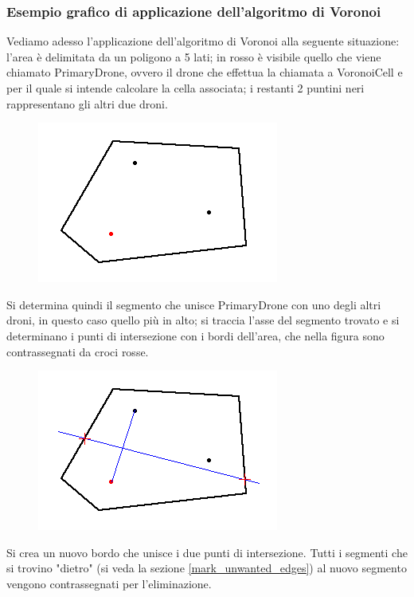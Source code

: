 \documentclass[10pt,a4paper]{article}
\newcommand{\name}[1]{{\color{purple}#1}}
\begin{document}
\subsubsection{Esempio grafico di applicazione dell'algoritmo di Voronoi}

Vediamo adesso l'applicazione dell'algoritmo di Voronoi alla seguente situazione: l'area è delimitata da un poligono a 5 lati; in rosso è visibile quello che viene chiamato \name{PrimaryDrone}, ovvero il drone che effettua la chiamata a \name{VoronoiCell} e per il quale si intende calcolare la cella associata; i restanti 2 puntini neri rappresentano gli altri due droni.

\begin{figure}[H]
\centering
\includegraphics[scale=0.7]{voronoi1.png}
\end{figure}

Si determina quindi il segmento che unisce \name{PrimaryDrone} con uno degli altri droni, in questo caso quello più in alto; si traccia l'asse del segmento trovato e si determinano i punti di intersezione con i bordi dell'area, che nella figura sono contrassegnati da croci rosse.

\begin{figure}[H]
\centering
\includegraphics[scale=0.7]{voronoi2.png}
\end{figure}

Si crea un nuovo bordo che unisce i due punti di intersezione. Tutti i segmenti che si trovino "dietro" (si veda la sezione \ref{mark_unwanted_edges}) al nuovo segmento vengono contrassegnati per l'eliminazione.
\end{document}
